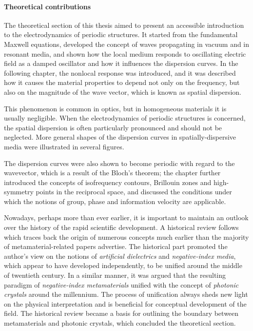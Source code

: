 \paragraph{Theoretical contributions}
The theoretical section of this thesis aimed to present an accessible introduction to the electrodynamics of periodic structures. It started from the fundamental Maxwell equations, developed the concept of waves propagating in vacuum and in resonant media, and shown how the local medium responds to oscillating electric field as a damped oscillator and how it influences the dispersion curves. In the following chapter, the nonlocal response was introduced, and it was described how it causes the material properties to depend not only on the frequency, but also on the magnitude of the wave vector, which is known as spatial dispersion. 

This phenomenon is common in optics, but in homogeneous materials it is usually negligible. When the electrodynamics of periodic structures is concerned, the spatial dispersion is often particularly pronounced and should not be neglected. More general shapes of the dispersion curves in spatially-dispersive media were illustrated in several figures. 

The dispersion curves were also shown to become periodic with regard to the wavevector, which is a result of the Bloch's theorem; the chapter further introduced the concepts of isofrequency contours, Brillouin zones and high-symmetry points in the reciprocal space, and discussed the conditions under which the notions of group, phase and information velocity are applicable.

Nowadays, perhaps more than ever earlier, it is important to maintain an outlook over the history of the rapid scientific development. A  historical review follows which traces back the origin of numerous concepts much earlier than the majority of metamaterial-related papers advertise. %
The historical part promoted the author's view on the notions of \textit{artificial dielectrics} and \textit{negative-index media}, which appear to have developed independently, to be unified around the middle of twentieth century. In a similar manner, it was argued that the resulting paradigm of \textit{negative-index metamaterials} unified with the concept of \textit{photonic crystals} around the millennium. The process of unification always sheds new light on the physical interpretation and is beneficial for conceptual development of the field. The historical review became a basis for outlining the boundary between metamaterials and photonic crystals, which concluded the theoretical section.

